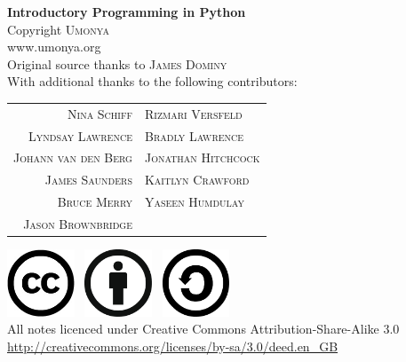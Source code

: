 \begin{titlepage}
\begin{center}
{ \huge \bfseries Introductory Programming in Python } \\[5cm]
{\LARGE Copyright \textsc{Umonya}\\
www.umonya.org }\\[1cm]

Original source thanks to \textsc{James Dominy} \\[0.5cm]
With additional thanks to the following contributors: \\[0.5cm]
\begin{tabular}{r l}
\textsc{Nina Schiff} & \textsc{Rizmari Versfeld}\\
\textsc{Lyndsay Lawrence} & \textsc{Bradly Lawrence}\\
\textsc{Johann van den Berg} & \textsc{Jonathan Hitchcock} \\
\textsc{James Saunders} & \textsc{Kaitlyn Crawford} \\
\textsc{Bruce Merry} & \textsc{Yaseen Humdulay} \\
\textsc{Jason Brownbridge} & \\
\end{tabular}
\vfill

\includegraphics[width=0.15\textwidth]{./cc-logo.jpg}~
\includegraphics[width=0.15\textwidth]{./attribution-by.png}~
\includegraphics[width=0.15\textwidth]{./share-alike-sa.png}~ \\[0.5cm]
{\large All notes licenced under Creative Commons Attribution-Share-Alike 3.0 } \\
{\large \url{http://creativecommons.org/licenses/by-sa/3.0/deed.en_GB} }\\
\end{center}
\end{titlepage}
